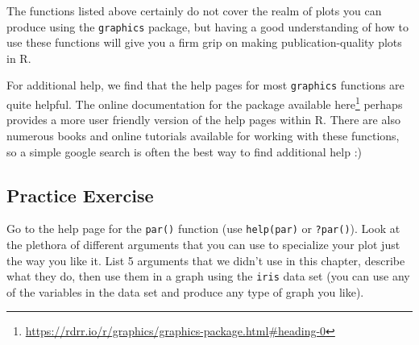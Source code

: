 \documentclass[]{krantz}
\renewcommand{\href}[2]{#2\footnote{\url{#1}}}
\begin{document}
The functions listed above certainly do not cover the realm of plots you
can produce using the \texttt{graphics} package, but having a good
understanding of how to use these functions will give you a firm grip on
making publication-quality plots in R.

For additional help, we find that the help pages for most
\texttt{graphics} functions are quite helpful. The online documentation
for the package available
\href{https://rdrr.io/r/graphics/graphics-package.html\#heading-0}{here}
perhaps provides a more user friendly version of the help pages within
R. There are also numerous books and online tutorials available for
working with these functions, so a simple google search is often the
best way to find additional help :)

\subsection{Practice Exercise}\label{practice-exercise-16}

Go to the help page for the \texttt{par()} function (use
\texttt{help(par)} or \texttt{?par()}). Look at the plethora of
different arguments that you can use to specialize your plot just the
way you like it. List 5 arguments that we didn't use in this chapter,
describe what they do, then use them in a graph using the \texttt{iris}
data set (you can use any of the variables in the data set and produce
any type of graph you like).



\backmatter
\printindex
\end{document}
